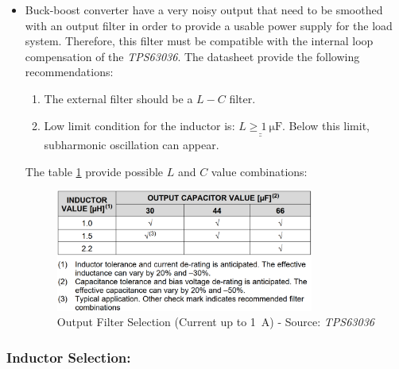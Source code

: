 \documentclass[report.tex]{subfiles}
\begin{document}
\begin{itemize}[\;]
\item Buck-boost converter have a very noisy output that need to be smoothed with an output filter in order to provide a usable power supply for the load system. Therefore, this filter must be compatible with the internal loop compensation of the \textit{TPS63036}. The datasheet provide the following recommendations:
\begin{enumerate}
\item The external filter should be a $L-C$ filter.
\item Low limit condition for the inductor is: $\underline{\underline{L \geq \SI{1}{\micro\farad}}}$. Below this limit, subharmonic oscillation can appear.
\end{enumerate}
The table \ref{fig:TPS63036_output_capacitor_filter} provide possible $L$ and $C$ value combinations:
\begin{figure}[H]
	\centering
	\includegraphics[width=0.8\textwidth]{Include/Figure/comp/TPS63036_output_capacitor_filter.png}
	\caption{Output Filter Selection (Current up to \SI{1}{\ampere}) - Source: \textit{TPS63036}\cite{TPS63036}}
	\label{fig:TPS63036_output_capacitor_filter}
\end{figure}
\end{itemize}


\subsubsection{Inductor Selection:}
\end{document}
